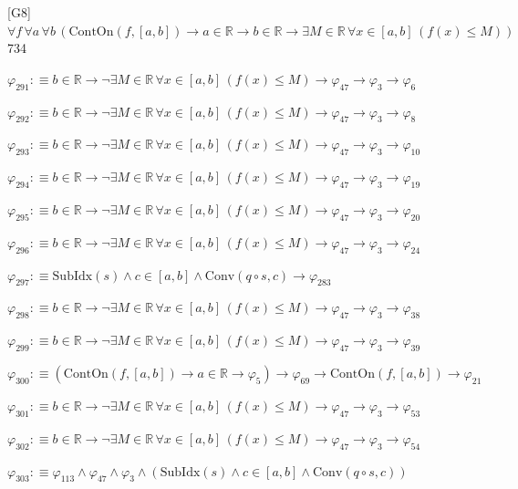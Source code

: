\begin{fullproof}{[G8]}{$\forall f\,\forall a\,\forall b\,(\mathrm{ContOn}(f,[a,b]) \to a \in \mathbb{R} \to b \in \mathbb{R} \to \exists M \in \mathbb{R}\,\forall x \in [a,b]\,(f(x) \leq M))$}{734}
\begin{abbrevlist}
\item $\varphi_{291} :\equiv b \in \mathbb{R} \to \neg \exists M \in \mathbb{R}\,\forall x \in [a,b]\,(f(x) \leq M) \to \varphi_{47} \to \varphi_{3} \to \varphi_{6}$
\item $\varphi_{292} :\equiv b \in \mathbb{R} \to \neg \exists M \in \mathbb{R}\,\forall x \in [a,b]\,(f(x) \leq M) \to \varphi_{47} \to \varphi_{3} \to \varphi_{8}$
\item $\varphi_{293} :\equiv b \in \mathbb{R} \to \neg \exists M \in \mathbb{R}\,\forall x \in [a,b]\,(f(x) \leq M) \to \varphi_{47} \to \varphi_{3} \to \varphi_{10}$
\item $\varphi_{294} :\equiv b \in \mathbb{R} \to \neg \exists M \in \mathbb{R}\,\forall x \in [a,b]\,(f(x) \leq M) \to \varphi_{47} \to \varphi_{3} \to \varphi_{19}$
\item $\varphi_{295} :\equiv b \in \mathbb{R} \to \neg \exists M \in \mathbb{R}\,\forall x \in [a,b]\,(f(x) \leq M) \to \varphi_{47} \to \varphi_{3} \to \varphi_{20}$
\item $\varphi_{296} :\equiv b \in \mathbb{R} \to \neg \exists M \in \mathbb{R}\,\forall x \in [a,b]\,(f(x) \leq M) \to \varphi_{47} \to \varphi_{3} \to \varphi_{24}$
\item $\varphi_{297} :\equiv \mathrm{SubIdx}(s) \land c \in [a,b] \land \mathrm{Conv}(q \circ s,c) \to \varphi_{283}$
\item $\varphi_{298} :\equiv b \in \mathbb{R} \to \neg \exists M \in \mathbb{R}\,\forall x \in [a,b]\,(f(x) \leq M) \to \varphi_{47} \to \varphi_{3} \to \varphi_{38}$
\item $\varphi_{299} :\equiv b \in \mathbb{R} \to \neg \exists M \in \mathbb{R}\,\forall x \in [a,b]\,(f(x) \leq M) \to \varphi_{47} \to \varphi_{3} \to \varphi_{39}$
\item $\varphi_{300} :\equiv (\mathrm{ContOn}(f,[a,b]) \to a \in \mathbb{R} \to \varphi_{5}) \to \varphi_{69} \to \mathrm{ContOn}(f,[a,b]) \to \varphi_{21}$
\item $\varphi_{301} :\equiv b \in \mathbb{R} \to \neg \exists M \in \mathbb{R}\,\forall x \in [a,b]\,(f(x) \leq M) \to \varphi_{47} \to \varphi_{3} \to \varphi_{53}$
\item $\varphi_{302} :\equiv b \in \mathbb{R} \to \neg \exists M \in \mathbb{R}\,\forall x \in [a,b]\,(f(x) \leq M) \to \varphi_{47} \to \varphi_{3} \to \varphi_{54}$
\item $\varphi_{303} :\equiv \varphi_{113} \land \varphi_{47} \land \varphi_{3} \land (\mathrm{SubIdx}(s) \land c \in [a,b] \land \mathrm{Conv}(q \circ s,c))$

\end{abbrevlist}
\end{fullproof}
